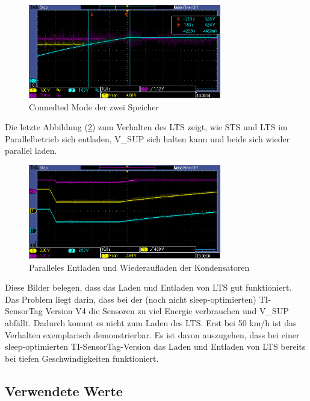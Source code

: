 \begin{figure}[ht]
   \includegraphics[width=0.75\textwidth]{4Resultate/imag/STS_LTS_connect.PNG}
    \caption{Connedted Mode der zwei Speicher}
    \label{connected_mode}
\end{figure}

Die letzte Abbildung (\ref{parallel_entladen}) zum Verhalten des LTS zeigt, wie STS und LTS im Parallelbetrieb sich entladen, V\_SUP sich halten kann und beide sich wieder parallel laden. 

\begin{figure}[ht]
   \includegraphics[width=0.75\textwidth]{4Resultate/imag/pic1.PNG}
    \caption{Paralleles Entladen und Wiederaufladen der Kondensatoren}
    \label{parallel_entladen}
\end{figure}

Diese Bilder belegen, dass das Laden und Entladen von LTS gut funktioniert. Das Problem liegt darin, dass bei der (noch nicht sleep-optimierten) TI-SensorTag Version V4 die Sensoren zu viel Energie verbrauchen und V\_SUP abfällt. Dadurch kommt es nicht zum Laden des LTS. Erst bei 50 km/h ist das Verhalten exemplarisch demonstrierbar. Es ist davon auszugehen, dass bei einer sleep-optimierten TI-SensorTag-Version das Laden und Entladen von LTS bereits bei tiefen Geschwindigkeiten funktioniert.

\subsection{Verwendete Werte}
\label{werte}

